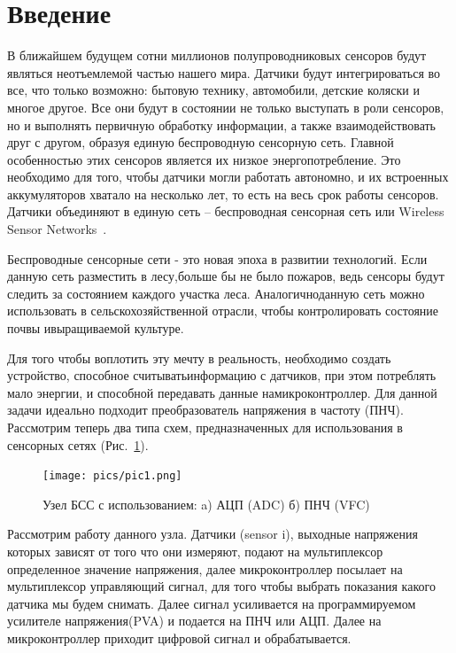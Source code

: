 \documentclass[a4paper,12pt,oneside]{scrartcl}
\begin{document}

\cleardoublepage


\tableofcontents
\listoffigures
\listoftables

\cleardoublepage

\section{Введение}
В ближайшем будущем сотни миллионов полупроводниковых сенсоров будут  являться неотъемлемой частью нашего мира. Датчики будут интегрироваться во все, что только возможно: бытовую технику, автомобили, детские коляски и многое другое. Все они будут в состоянии не только выступать в роли сенсоров, но и выполнять первичную обработку информации, а также взаимодействовать друг с другом, образуя единую беспроводную сенсорную сеть. Главной особенностью этих сенсоров является их низкое энергопотребление. Это необходимо для того, чтобы датчики могли работать автономно, и их встроенных аккумуляторов хватало на несколько лет, то есть на весь срок работы сенсоров.  Датчики объединяют в единую сеть – беспроводная сенсорная сеть или Wireless Sensor Networks~\cite{B1}.

Беспроводные сенсорные сети - это новая эпоха в развитии технологий. Если данную сеть разместить в лесу,больше бы не было пожаров, ведь сенсоры будут следить за состоянием каждого участка леса. Аналогичноданную сеть можно использовать в сельскохозяйственной отрасли, чтобы контролировать состояние почвы ивыращиваемой культуре.

Для того чтобы воплотить эту мечту в реальность, необходимо создать устройство, способное считыватьинформацию с датчиков, при этом потреблять мало энергии, и способной передавать данные намикроконтроллер. Для данной задачи идеально подходит преобразователь напряжения в частоту (ПНЧ).
Рассмотрим теперь два типа схем, предназначенных для использования в сенсорных сетях
(Рис.~\ref{fig:WSN}).

\begin{figure}[!htb]
    \centering
    \texttt{[image: pics/pic1.png]}
    \caption{Узел БСС с использованием: a) АЦП (ADC) б) ПНЧ (VFC)}
    \label{fig:WSN}
\end{figure}
Рассмотрим работу данного узла. Датчики (sensor i), выходные напряжения которых зависят от того что они измеряют, подают на мультиплексор определенное значение напряжения, далее микроконтроллер посылает на мультиплексор управляющий сигнал, для того чтобы выбрать показания какого датчика мы будем снимать. Далее сигнал усиливается на программируемом усилителе напряжения(PVA) и подается на ПНЧ или АЦП. Далее на микроконтроллер приходит цифровой сигнал и обрабатывается.
\end{document}
